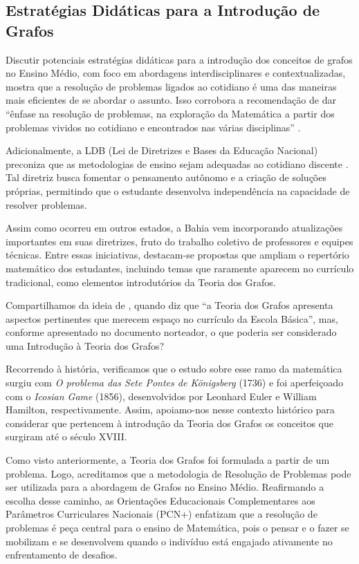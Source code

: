 \documentclass[
  12pt,
  oneside,
  a4paper,
  english,
  brazilian
  ]{abntex2}
\theoremstyle{definition}
\begin{document}
\subsection{Estratégias Didáticas para a Introdução de Grafos}

Discutir potenciais estratégias didáticas para a introdução dos conceitos de grafos no Ensino Médio, com foco em abordagens interdisciplinares e contextualizadas, mostra que a resolução de problemas ligados ao cotidiano é uma das maneiras mais eficientes de se abordar o assunto. Isso corrobora a recomendação de dar ``ênfase na resolução de problemas, na exploração da Matemática a partir dos problemas vividos no cotidiano e encontrados nas várias disciplinas'' \cite{brasil2002}.

Adicionalmente, a LDB (Lei de Diretrizes e Bases da Educação Nacional) preconiza que as metodologias de ensino sejam adequadas ao cotidiano discente \cite{brasil1996}. Tal diretriz busca fomentar o pensamento autônomo e a criação de soluções próprias, permitindo que o estudante desenvolva independência na capacidade de resolver problemas.

Assim como ocorreu em outros estados, a Bahia vem incorporando atualizações importantes em suas diretrizes, fruto do trabalho coletivo de professores e equipes técnicas. Entre essas iniciativas, destacam-se propostas que ampliam o repertório matemático dos estudantes, incluindo temas que raramente aparecem no currículo tradicional, como elementos introdutórios da Teoria dos Grafos.

Compartilhamos da ideia de \textcite{malta2008}, quando diz que ``a Teoria dos Grafos apresenta aspectos pertinentes que merecem espaço no currículo da Escola Básica'', mas, conforme apresentado no documento norteador, o que poderia ser considerado uma Introdução à Teoria dos Grafos?

Recorrendo à história, verificamos que o estudo sobre esse ramo da matemática surgiu com \textit{O problema das Sete Pontes de Königsberg} (1736) e foi aperfeiçoado com o \textit{Icosian Game} (1856), desenvolvidos por Leonhard Euler e William Hamilton, respectivamente. Assim, apoiamo-nos nesse contexto histórico para considerar que pertencem à introdução da Teoria dos Grafos os conceitos que surgiram até o século XVIII.

Como visto anteriormente, a Teoria dos Grafos foi formulada a partir de um problema. Logo, acreditamos que a metodologia de Resolução de Problemas pode ser utilizada para a abordagem de Grafos no Ensino Médio. Reafirmando a escolha desse caminho, as Orientações Educacionais Complementares aos Parâmetros Curriculares Nacionais (PCN+) enfatizam que a resolução de problemas é peça central para o ensino de Matemática, pois o pensar e o fazer se mobilizam e se desenvolvem quando o indivíduo está engajado ativamente no enfrentamento de desafios.
\end{document}
